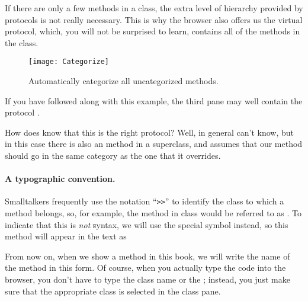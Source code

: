 \documentclass[a4paper,10pt,twoside]{book}
\begin{document}
{If there are only a few methods in a class, the extra level of hierarchy provided by protocols is not really necessary.
This is why the browser also offers us the  virtual protocol, which, you will not be surprised to learn, contains all of the methods in the class.

\begin{figure}[htbp]
   \centering
   \texttt{[image: Categorize]} 
   \caption{Automatically categorize all uncategorized methods.}
\end{figure}

If you have followed along with this example, the third pane may well contain the protocol .

How does \pharo{} know that this is the right protocol?  Well, in general \pharo{} can't know, but in this case there is also an  method in a superclass, and \pharo assumes that our  method should go in the same category as the one that it overrides.


\paragraph{A typographic convention.} Smalltalkers frequently use the notation ``\verb|>>|'' to identify the class to which a method belongs, so, for example, the  method in class  would be referred to as .
To indicate that this is \emph{not} \st syntax, we will use the special symbol \ct{>>>} instead, so this method will appear in the text as 

From now on, when we show a method in this book, we will write the name of the method in this form.  Of course, when you actually type the code into the browser, you don't have to type the class name or the \ct{>>>}; instead, you just make sure that the appropriate class is selected in the class pane.  

}
\end{document}
